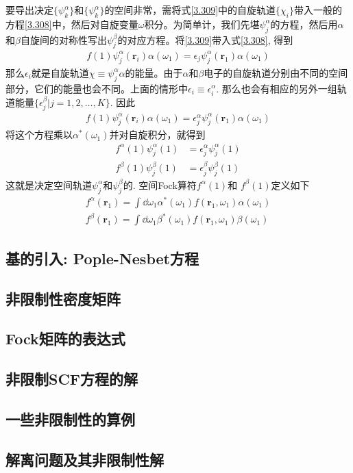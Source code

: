 要导出决定$\{\psi_k^\alpha \}$和$\{\psi_k^\alpha \}$的空间非常，需将式\eqref{3.309}中的自旋轨道$\{\chi_i\}$带入一般的\hft 方程\eqref{3.308}中，然后对自旋变量$\omega$积分。为简单计，我们先堪$\psi_j^\alpha$的方程，然后用$\alpha$和$\beta$自旋间的对称性写出$\psi_j^\beta$的对应方程。将\eqref{3.309}带入式\eqref{3.308}, 得到
\begin{align}
f(1)\psi_j^\alpha(\mathbf{r}_i) \alpha(\omega_1) = \epsilon_j \psi_j^\alpha(\mathbf{r}_1) \alpha(\omega_1)
\end{align}
那么$\epsilon_i$就是自旋轨道$\chi\equiv\psi_j^\alpha\alpha$的能量。由于$\alpha$和$\beta$电子的自旋轨道分别由不同的空间部分，它们的能量也会不同。上面的情形中$\epsilon_i\equiv\epsilon^\alpha_i$. 那么也会有相应的另外一组轨道能量$\{\epsilon_j^\beta | j=1,2,\ldots,K\}$. 因此
\begin{align}
f(1)\psi_j^\alpha(\mathbf{r}_i) \alpha(\omega_1) = \epsilon_j^\alpha \psi_j^\alpha(\mathbf{r}_1) \alpha(\omega_1)
\end{align}
将这个方程乘以$\alpha^*(\omega_1)$并对自旋积分，就得到
\begin{align}
f^\alpha(1)\psi_j^\alpha(1) & = \epsilon_j^\alpha \psi_j^\alpha(1)\\
f^\beta (1)\psi_j^\beta(1)  & = \epsilon_j^\beta \psi_j^\beta(1)
\end{align}
这就是决定空间轨道$\psi_j^\alpha$和$\psi_j^\beta$的. 空间Fock算符$f^\alpha(1)$和 $f^\beta (1)$定义如下
\begin{align}
f^\alpha(\mathbf{r}_1) = \int\dd\omega_1 \alpha^*(\omega_1) f(\mathbf{r}_1,\omega_1)\alpha(\omega_1)\\
f^\beta(\mathbf{r}_1) = \int\dd\omega_1 \beta^*(\omega_1) f(\mathbf{r}_1,\omega_1)\beta(\omega_1)
\end{align}
\subsection{基的引入: Pople-Nesbet方程}
\subsection{非限制性密度矩阵}
\subsection{Fock矩阵的表达式}
\subsection{非限制SCF方程的解}
\subsection{一些非限制性的算例}
\subsection{解离问题及其非限制性解}

\theendnotes

